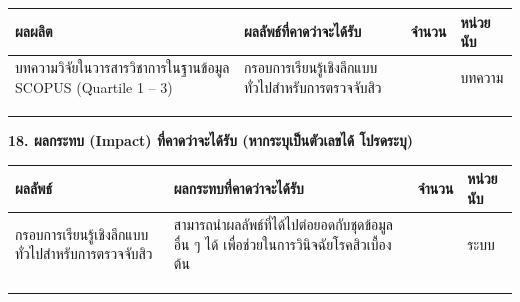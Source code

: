 \documentclass[16pt]{extarticle}
\newcounter{none} %
\begin{document}
{\def\LTcaptype{none} %
\begin{longtable}[]{@{}
  >{\raggedright\arraybackslash}p{}
  >{\raggedright\arraybackslash}p{}
  >{\raggedright\arraybackslash}p{}
  >{\raggedright\arraybackslash}p{}@{}}
\toprule\noalign{}
\begin{minipage}[b]{\linewidth}\centering
\textbf{ผลผลิต}
\end{minipage} & \begin{minipage}[b]{\linewidth}\centering
\textbf{ผลลัพธ์ที่คาดว่าจะได้รับ}
\end{minipage} & \begin{minipage}[b]{\linewidth}\centering
\textbf{จำนวน}
\end{minipage} & \begin{minipage}[b]{\linewidth}\centering
\textbf{หน่วยนับ}
\end{minipage} \\
\midrule\noalign{}
\endhead
\bottomrule\noalign{}
\endlastfoot
บทความวิจัยในวารสารวิชาการในฐานข้อมูล SCOPUS (Quartile 1 -- 3) &
กรอบการเรียนรู้เชิงลึกแบบทั่วไปสำหรับการตรวจจับสิว & 1 & บทความ \\
& & & \\
& & & \\
& & & \\
\end{longtable}
}

\textbf{18. ผลกระทบ (Impact) ที่คาดว่าจะได้รับ (หากระบุเป็นตัวเลขได้ โปรดระบุ)}

{\def\LTcaptype{none} %
\begin{longtable}[]{@{}
  >{\raggedright\arraybackslash}p{}
  >{\raggedright\arraybackslash}p{}
  >{\raggedright\arraybackslash}p{}
  >{\raggedright\arraybackslash}p{}@{}}
\toprule\noalign{}
\begin{minipage}[b]{\linewidth}\centering
\textbf{ผลลัพธ์}
\end{minipage} & \begin{minipage}[b]{\linewidth}\centering
\textbf{ผลกระทบที่คาดว่าจะได้รับ}
\end{minipage} & \begin{minipage}[b]{\linewidth}\centering
\textbf{จำนวน}
\end{minipage} & \begin{minipage}[b]{\linewidth}\centering
\textbf{หน่วยนับ}
\end{minipage} \\
\midrule\noalign{}
\endhead
\bottomrule\noalign{}
\endlastfoot
กรอบการเรียนรู้เชิงลึกแบบทั่วไปสำหรับการตรวจจับสิว &
สามารถนำผลลัพธ์ที่ได้ไปต่อยอดกับชุดข้อมูลอื่น ๆ ได้ เพื่อช่วยในการวินิจฉัยโรคสิวเบื้องต้น & 1 &
ระบบ \\
& & & \\
& & & \\
& & & \\
\end{longtable}
}
\end{document}
